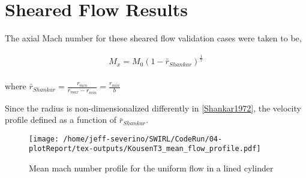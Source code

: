 \section{Sheared Flow Results}

The axial Mach number for these sheared flow validation cases were taken to be,

\begin{align}
    M_x = M_0 \left( 1 - \bar{r}_{Shankar} \right)^{ \frac{1}{7}}
    \label{eqn:cylindricalShear} \\
\end{align}

where $\bar{r}_{Shankar} = \frac{r_{min}}{r_{max}-r_{min}} = \frac{r_{min}}{b}$ 

Since the radius is non-dimensionalized differently in \ref{Shankar1972}, the 
velocity profile defined as a function of $\bar{r}_{Shankar}$.

\begin{figure}[h!]
    \centering
    \texttt{[image: /home/jeff-severino/SWIRL/CodeRun/04-plotReport/tex-outputs/KousenT3\_mean\_flow\_profile.pdf]}
    \caption{Mean mach number profile for the uniform flow in a lined cylinder}
    \label{fig:1}
\end{figure}

